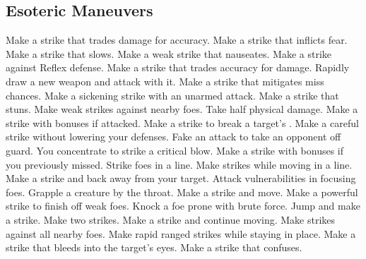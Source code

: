 
\small
\subsection{Esoteric Maneuvers}\label{Esoteric Maneuvers}
\begin{spelllist}
 Make a strike that trades damage for accuracy.
 Make a strike that inflicts fear.
 Make a strike that slows.
 Make a weak strike that nauseates.
 Make a strike against Reflex defense.
 Make a strike that trades accuracy for damage.
 Rapidly draw a new weapon and attack with it.
 Make a strike that mitigates miss chances.
 Make a sickening strike with an unarmed attack.
 Make a strike that stuns.
 Make weak strikes against nearby foes.
 Take half physical damage.
 Make a strike with bonuses if attacked.
 Make a strike to break a target's .
 Make a careful strike without lowering your defenses.
 Fake an attack to take an opponent off guard.
 You concentrate to strike a critical blow.
 Make a strike with bonuses if you previously missed.
 Strike foes in a line.
 Make strikes while moving in a line.
 Make a strike and back away from your target.
 Attack vulnerabilities in focusing foes.
 Grapple a creature by the throat.
 Make a strike and move.
 Make a powerful strike to finish off weak foes.
 Knock a foe prone with brute force.
 Jump and make a strike.
 Make two strikes.
 Make a strike and continue moving.
 Make strikes against all nearby foes.
 Make rapid ranged strikes while staying in place.
 Make a strike that bleeds into the target's eyes.
 Make a strike that confuses.

\end{spelllist}
